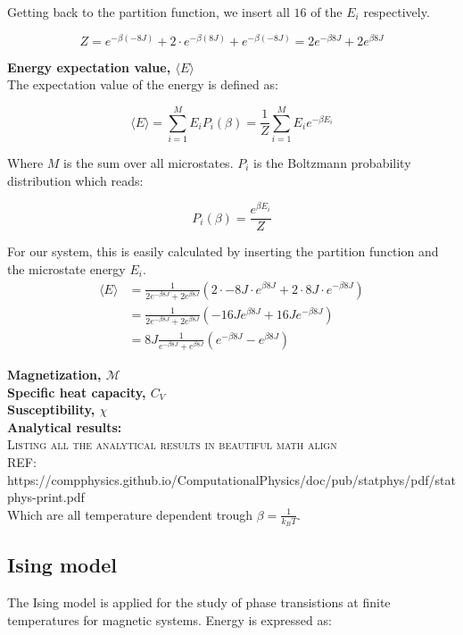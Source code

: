 \documentclass[../main.tex]{subfiles}
\begin{document}
    Getting back to the partition function, we insert all $16$ of the $E_i$ respectively.

    \[Z = e^{-\beta (-8J)} + 2 \cdot e^{-\beta (8J)} + e^{-\beta (-8J)} = 2e^{-\beta 8J} + 2e^{\beta 8J}\]

    \textbf{Energy expectation value, $\langle E \rangle$}\\
    The expectation value of the energy is defined as:

    \[\langle E \rangle = \sum_{i=1}^M E_i P_i(\beta) = \frac{1}{Z}\sum_{i=1}^M E_i e^{-\beta E_i}\]

    Where $M$ is the sum over all microstates. $P_i$ is the Boltzmann probability distribution which reads:

    \[P_i(\beta) = \frac{e^{\beta E_i}}{Z}\]

    For our system, this is easily calculated by inserting the partition function and the microstate energy $E_i$.
    \begin{align*}
      \langle E \rangle &= \frac{1}{2e^{-\beta 8J} + 2e^{\beta 8J}} \left(2 \cdot -8J \cdot e^{\beta 8J} + 2\cdot 8J \cdot e^{-\beta8J}\right)\\
        &= \frac{1}{2e^{-\beta 8J} + 2e^{\beta 8J}} \left(-16J e^{\beta8J} + 16Je^{-\beta 8J}\right)\\
        &= 8J \frac{1}{e^{-\beta 8J} + e^{\beta 8J}}  \left(e^{-\beta8J} - e^{\beta 8J}\right)
    \end{align*}

    \textbf{Magnetization, $\mathcal{M}$}\\
    \textbf{Specific heat capacity, $C_V$}\\
    \textbf{Susceptibility, $\chi$}\\

    \textbf{Analytical results:}\\
    \textsc{Listing all the analytical results in beautiful math align}\\
    REF: https://compphysics.github.io/ComputationalPhysics/doc/pub/statphys/pdf/statphys-print.pdf\\
    
    Which are all temperature dependent trough $\beta = \frac{1}{k_B T}$.


    \subsection{Ising model}
    The Ising model is applied for the study of phase transistions at finite temperatures
    for magnetic systems. Energy is expressed as:
\end{document}
